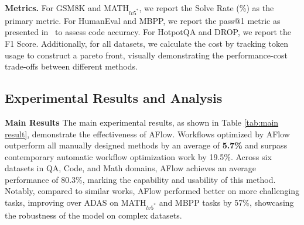 \documentclass{article} %
\newcommand{\model}{{\sc AFlow}\xspace}
\theoremstyle{plain}
\theoremstyle{definition}
\theoremstyle{remark}
\begin{document}
\textbf{Metrics.} For GSM8K and MATH$_{lv5^*}$, we report the Solve Rate (\%) as the primary metric. For HumanEval and MBPP, we report the pass@1 metric as presented in~\citep{Chen2021Humaneval} to assess code accuracy. For HotpotQA and DROP, we report the F1 Score. Additionally, for all datasets, we calculate the cost by tracking token usage to construct a pareto front, visually demonstrating the performance-cost trade-offs between different methods.

\subsection{Experimental Results and Analysis}

\noindent\textbf{Main Results} The main experimental results, as shown in Table \ref{tab:main result}, demonstrate the effectiveness of \model. Workflows optimized by \model outperform all manually designed methods by an average of \textbf{5.7\%} and surpass contemporary automatic workflow optimization work by 19.5\%. Across six datasets in QA, Code, and Math domains, \model achieves an average performance of 80.3\%, marking the capability and usability of this method. Notably, compared to similar works, \model performed better on more challenging tasks, improving over ADAS on MATH$_{lv5^*}$ and MBPP tasks by 57\%, showcasing the robustness of the model on complex datasets.

\vspace{-5mm}
\end{document}

